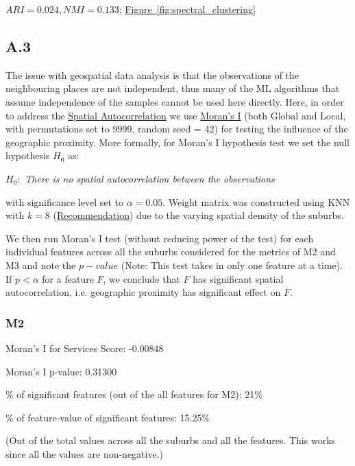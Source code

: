 \documentclass[
	a4paper, %
	10pt, %
	unnumberedsections, %
	twoside, %
]{LTJournalArticle}
\begin{document}
$ARI=0.024, NMI=0.133$;  \hyperref[sub@fig:spectral_clustering]{Figure~\ref{fig:spectral_clustering}}


\subsection{A.3}


The issue with geospatial data analysis is that the observations of the neighbouring places are not independent, thus many of the ML algorithms that assume independence of the samples cannot be used here directly. Here, in order to address the \href{https://www.sciencedirect.com/topics/mathematics/spatial-autocorrelation}{Spatial Autocorrelation} we use \href{https://en.wikipedia.org/wiki/Moran%27s_I}{Moran's I} (both Global and Local, with permutations set to 9999, random seed = 42) for testing the influence of the geographic proximity. More formally, for Moran's I hypothesis test we set the null hypothesis $H_0$ as:

$H_0:$ \textit{There is no spatial autocorrelation between the observations}

with significance level set to $\alpha =0.05$. Weight matrix was constructed using KNN with $k=8$ (\href{https://pro.arcgis.com/en/pro-app/latest/tool-reference/spatial-statistics/spatial-autocorrelation.htm}{Recommendation}) due to the varying spatial density of the suburbs.

We then run Moran's I test (without reducing power of the test) for each individual features across all the suburbs considered for the metrics of M2 and M3 and note the $p-value$ (Note: This test takes in only one feature at a time). If $p<\alpha$ for a feature $F$, we conclude that $F$ has significant spatial autocorrelation, i.e. geographic proximity has significant effect on $F$.

\subsubsection{M2}\leavevmode

Moran's I for Services Score: -0.00848

Moran's I p-value: 0.31300

\% of significant features (out of the all features for M2): 21\%

\% of feature-value of significant features: 15.25\%

(Out of the total values across all the suburbs and all the features. This works since all the values are non-negative.)
\end{document}
